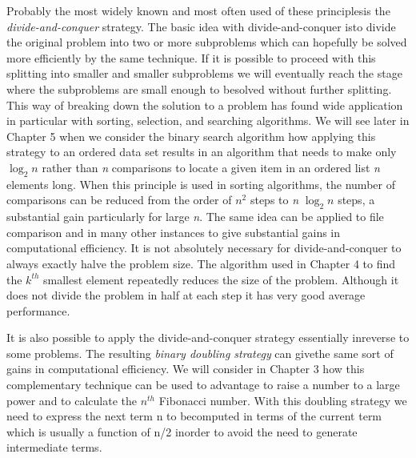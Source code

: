 \documentclass{book}
\begin{document}
	Probably the most widely known and most often used of these principlesis the \textit{divide-and-conquer} strategy. The basic idea with divide-and-conquer isto divide the original problem into two or more subproblems which can hopefully be solved more efficiently by the same technique. If it is possible to proceed with this splitting into smaller and smaller subproblems we will eventually reach the stage where the subproblems are small enough to besolved without further splitting. This way of breaking down the solution to a problem has found wide application in particular with sorting, selection, and searching algorithms. We will see later in Chapter 5 when we consider the binary search algorithm how applying this strategy to an ordered data set results in an algorithm that needs to make only $\log_{2}n$ rather than \textit{n} comparisons to locate a given item in an ordered list \textit{n} elements long. When this principle is used in sorting algorithms, the number of comparisons can be reduced from the order of $n^2$ steps to \textit{n} $\log_{2}n$ steps, a substantial gain particularly for large \textit{n}. The same idea can be applied to file comparison and in many other instances to give substantial gains in computational efficiency. It is not absolutely necessary for divide-and-conquer to always exactly halve the problem size. The algorithm used in Chapter 4 to find the $k^{th}$ smallest element repeatedly reduces the size of the problem. Although it does not divide the problem in half at each step it has very good average performance.\par 

	It is also possible to apply the divide-and-conquer strategy essentially inreverse to some problems. The resulting \textit{binary doubling strategy} can givethe same sort of gains in computational efficiency. We will consider in Chapter 3 how this complementary technique can be used to advantage to raise a number to a large power and to calculate the $n^{th}$ Fibonacci number. With this doubling strategy we need to express the next term n to becomputed in terms of the current term which is usually a function of n/2 inorder to avoid the need to generate intermediate terms.\par
\end{document}
